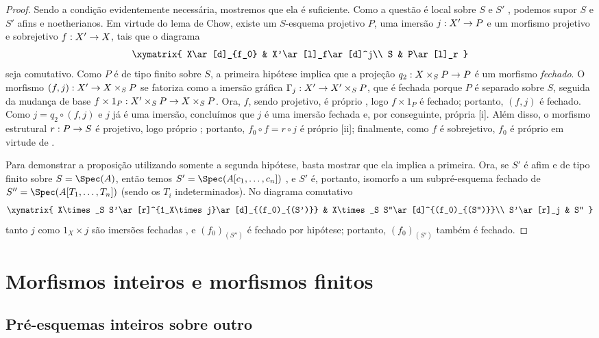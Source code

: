 \documentclass[oneside,10pt]{amsart}
\makeatletter
\newcommand{\ega@arrow}[2]{\mathchoice{#1}{#2}{#2}{#2}}
\renewcommand{\to}{\ega@arrow{\longrightarrow}{\rightarrow}}
\newcommand{\oldpage}[2][]{\marginnote{\normalfont\footnotesize\textbf{#1}~|~#2}\ignorespaces}
\let\EGAOriginalLabel\label
\renewcommand{\label}[1]{\phantomsection\EGAOriginalLabel{#1}}
\makeatother
\begin{document}
\begin{proof}
Sendo a condição evidentemente necessária, mostremos que ela é suficiente.
Como a questão é local sobre $S$ e $S'$ , podemos supor $S$ e $S'$ afins e noetherianos.
Em virtude do lema de Chow, existe um $S$-esquema projetivo $P$, uma imersão $j:X'\to P$ e um morfismo projetivo e sobrejetivo $f:X'\to X$, tais que o diagrama
\[
  \xymatrix{
    X\ar[d]_{f_0} &
    X'\ar[l]_f\ar[d]^j\\
    S &
    P\ar[l]_r
  }
\]
seja comutativo.
Como $P$ é de tipo finito sobre $S$, a primeira hipótese implica que a projeção $q_2:X\times_S P\to P$ é um morfismo \emph{fechado}.
O morfismo $(f,j):X'\to X\times_S P$ se fatoriza como a imersão gráfica $\Gamma_j:X'\to X'\times_S P$, que é fechada porque $P$ é separado sobre $S$, seguida da mudança de base $f\times1_P:X'\times_S P\to X\times_S P$.
Ora, $f$, sendo projetivo, é próprio , logo $f\times1_P$ é fechado; portanto, $(f,j)$ é fechado.
Como $j=q_2\circ(f,j)$ e $j$ já é uma imersão, concluímos que $j$ é uma imersão fechada e, por conseguinte, própria [i].
Além disso, o morfismo estrutural $r:P\to S$ é projetivo, logo próprio ; portanto, $f_0\circ f=r\circ j$ é próprio [ii]; finalmente, como $f$ é sobrejetivo, $f_0$ é próprio em virtude de .

Para demonstrar a proposição utilizando somente a segunda hipótese, basta mostrar que ela implica a primeira.
Ora, se $S'$ é afim e de tipo finito sobre $S=\Spec(A)$,
\oldpage[II]{110}
então temos $S'=\Spec(A[c_1,\ldots,c_n])$ , e $S'$ é, portanto, isomorfo a um subpré-esquema fechado de $S''=\Spec(A[T_1,\ldots,T_n])$ (sendo os $T_i$ indeterminados).
No diagrama comutativo
\[
  \xymatrix{
    X\times_S S'\ar[r]^{1_X\times j}\ar[d]_{(f_0)_{(S')}} &
    X\times_S S''\ar[d]^{(f_0)_{(S'')}}\\
    S'\ar[r]_j &
    S''
  }
\]
tanto $j$ como $1_X\times j$ são imersões fechadas , e $(f_0)_{(S'')}$ é fechado por hipótese;
portanto, $(f_0)_{(S')}$ também é fechado.
\end{proof}

\section{Morfismos inteiros e morfismos finitos}
\label{section:II.6}

\subsection{Pré-esquemas inteiros sobre outro}
\label{subsection:II.6.1}
\end{document}
